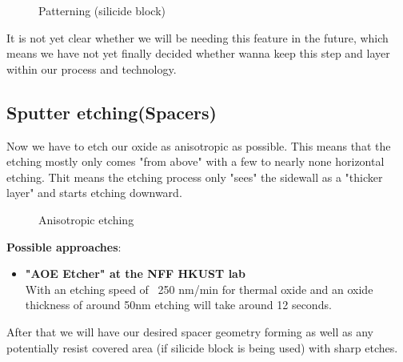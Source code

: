 \begin{figure}[H]
	\centering
	\begin{tikzpicture}[node distance = 3cm, auto, thick,scale=\CrossSectionOnly, every node/.style={transform shape}]
		
	\end{tikzpicture}
	\begin{tikzpicture}[node distance = 3cm, auto, thick,scale=\CrossSectionOnly, every node/.style={transform shape}]
		
	\end{tikzpicture}
	\caption{Patterning (silicide block)}
\end{figure}

It is not yet clear whether we will be needing this feature in the future, which means we have not yet finally decided whether wanna keep this step and layer within our process and technology.

\newpage

\subsection{Sputter etching(Spacers)}

Now we have to etch our oxide as anisotropic as possible.
This means that the etching mostly only comes "from above" with a few to nearly none horizontal etching.
Thit means the etching process only "sees" the sidewall as a "thicker layer" and starts etching downward.
\begin{figure}[H]
	\centering
	\begin{tikzpicture}[node distance = 3cm, auto, thick,scale=\CrossSectionOnly, every node/.style={transform shape}]
		
	\end{tikzpicture}
	\begin{tikzpicture}[node distance = 3cm, auto, thick,scale=\CrossSectionOnly, every node/.style={transform shape}]
		
	\end{tikzpicture}
	\caption{Anisotropic etching}
\end{figure}

\textbf{Possible approaches}:
\begin{itemize}
	\item\textbf{"AOE Etcher" at the NFF HKUST lab}\\
	With an etching speed of ~250 nm/min for thermal oxide and an oxide thickness of around 50nm etching will take around 12 seconds.
\end{itemize}
After that we will have our desired spacer geometry forming as well as any potentially resist covered area (if silicide block is being used) with sharp etches.

